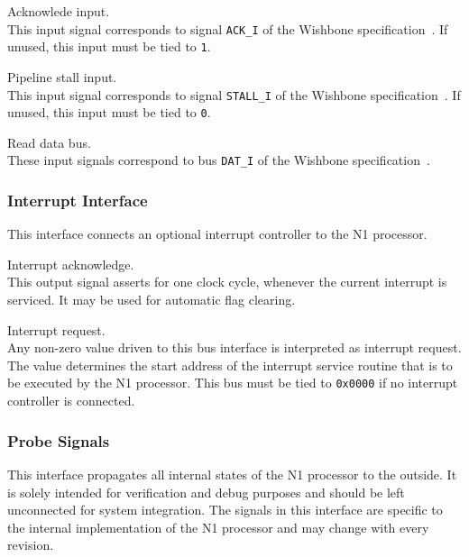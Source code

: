 \begin{description}[style=nextline]
\item[\texttt{sbus\_ack\_i}] Acknowlede input. \\   
  This input signal corresponds to signal \texttt{ACK\_I} of the Wishbone specification~\cite{wishbone}.
  If unused, this input must be tied to \texttt{1}.

\item[\texttt{sbus\_stall\_i}] Pipeline stall input. \\
  This input signal corresponds to signal \texttt{STALL\_I} of the Wishbone specification~\cite{wishbone}.
  If unused, this input must be tied to \texttt{0}.

\item[\texttt{sbus\_dat\_i}] Read data bus. \\ 
  These input signals correspond to bus \texttt{DAT\_I} of the Wishbone specification~\cite{wishbone}.

\end{description}

\subsubsection{Interrupt Interface}
\label{integration:if:irq}
This interface connects an optional interrupt controller to the N1 processor. 


\begin{description}[style=nextline]

\item[\texttt{irq\_ack\_o}] Interrupt acknowledge. \\
  This output signal asserts for one clock cycle, whenever the current interrupt is serviced.
  It may be used for automatic flag clearing.

\item[\texttt{irq\_req\_i}] Interrupt request. \\
  Any non-zero value driven to this bus interface is interpreted as interrupt request.
  The value determines the start address of the interrupt service routine that is to be executed by the
  N1 processor. This bus must be tied to \texttt{0x0000} if no interrupt controller is connected.
  
\end{description}

\subsubsection{Probe Signals}
\label{integration:if:prb}
This interface propagates all internal states of the N1 processor to the outside.
It is solely intended for verification and debug purposes and should be left unconnected for system integration.
The signals in this interface are specific to the internal implementation of the N1 processor and may change
with every revision.

